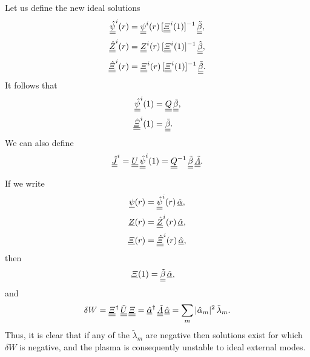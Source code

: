 \documentclass[12pt,prb,aps,notitlepage]{revtex4-1}
\begin{document}
Let us define the new ideal solutions
\begin{align}
\underline{\underline{\hat{\psi}}}^i(r)&=\underline{\underline{\psi}}^i(r)\,[\underline{\underline{\mit\Xi}}^i(1)]^{-1}\,\underline{\underline{\tilde{\beta}}},\\[0.5ex]
\underline{\underline{\hat{Z}}}^i(r)   &=\underline{\underline{Z}}^i(r)\,[\underline{\underline{\mit\Xi}}^{i}(1)]^{-1}\,\underline{\underline{\tilde{\beta}}},\\[0.5ex]
\underline{\underline{\hat{\mit\Xi}}}^i(r)   &=\underline{\underline{\mit\Xi}}^i(r)\,[\underline{\underline{\mit\Xi}}^{i}(1)]^{-1}\,\underline{\underline{\tilde{\beta}}}.
\end{align}
It follows that
\begin{align}
\underline{\underline{\hat{\psi}}}^i(1)&=\underline{\underline{Q}}\,\underline{\underline{\tilde{\beta}}},\\[0.5ex]
\underline{\underline{\hat{\mit\Xi}}}^i(1)&=\underline{\underline{\tilde{\beta}}}.
\end{align}
We can also define
\begin{equation}
\underline{\underline{\hat{J}}}^i=\underline{\underline{U}}\,\underline{\underline{\hat{\psi}}}^i(1)= \underline{\underline{Q}}^{-1}\,\underline{\underline{\tilde{\beta}}}\,
\underline{\underline{\tilde{\mit\Lambda}}}.
\end{equation}

If we write
\begin{align}
\underline{\psi}(r)&= \underline{\underline{\hat{\psi}}}^i(r)\,\underline{\hat{\alpha}},\\[0.5ex]
\underline{Z}(r)&= \underline{\underline{\hat{Z}}}^i(r)\,\underline{\hat{\alpha}},\\[0.5ex]
\underline{{\mit\Xi}}(r)&= \underline{\underline{\hat{\mit\Xi}}}^i(r)\,\underline{\hat{\alpha}},
\end{align}
then
\begin{align}
\underline{{\mit\Xi}}(1) &=\underline{\underline{\tilde{\beta}}}\,\underline{\hat{\alpha}},
\end{align}
and 
\begin{equation}
 \delta W= \underline{\underline{\mit\Xi}}^\dag\,\underline{\underline{\tilde{U}}}\,\underline{\underline{{\mit\Xi}}}=\underline{\hat{\alpha}}^\dag\,\underline{\underline{\tilde{\mit\Lambda}}}\,\underline{\hat{\alpha}}= \sum_m |\hat{\alpha}_m|^2\,\tilde{\lambda}_m.
 \end{equation}
Thus, it is clear that if any of the $\tilde{\lambda}_m$ are negative then solutions exist for which $\delta W$ is negative, and the plasma
is consequently unstable to ideal external modes. 
\end{document}
